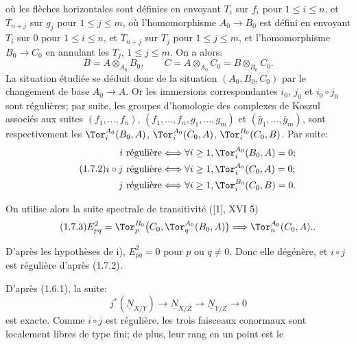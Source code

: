 
où les
flèches horizontales sont définies en envoyant $T_i$ sur $f_i$ pour $1\leq i\leq n$, et $T_{n+j}$ sur $g_j$ pour $1\leq j\leq m$, où l'homomorphisme $A_0\longrightarrow B_0$ est défini en envoyant $T_i$ sur $0$ pour $1\leq i\leq n$, et $T_{n+j}$ sur $T_j$ pour $1\leq j\leq m$, et l'homomorphisme $B_0\longrightarrow C_0$ en annulant les $T_j$, $1\leq j\leq m$. On a alors:
\[
 B=A\otimes_{A_0}B_0,
 \qquad
 C=A\otimes_{A_0}C_0=B\otimes_{B_0}C_0.
\]
La situation étudiée se déduit donc de la situation $(A_0,B_0,C_0)$ par le changement de base $A_0\longrightarrow A$. Or les immersions correspondantes $i_0$, $j_0$ et $i_0\circ j_0$ sont régulières; par suite, les groupes d'homologie des complexes de Koszul associés aux suites $(f_1,\ldots,f_n)$, $(f_1,\ldots,f_n,g_1,\ldots,g_m)$ et $(\bar g_1,\ldots,\bar g_m)$, sont respectivement les $\Tor_i^{A_0}(B_0,A)$, $\Tor_i^{A_0}(C_0,A)$, $\Tor_i^{B_0}(C_0,B)$. Par suite:
\begin{equation}\tag{1.7.2}
\begin{aligned}
 i\ \text{régulière} &\Longleftrightarrow \forall i\geq1,
 \Tor_i^{A_0}(B_0,A)=0;\\
 i\circ j\ \text{régulière} &\Longleftrightarrow \forall i\geq1,
 \Tor_i^{A_0}(C_0,A)=0;\\
 j\ \text{régulière} &\Longleftrightarrow \forall i\geq1,
 \Tor_i^{B_0}(C_0,B)=0.
\end{aligned}
\end{equation}

On utilise alors la suite spectrale de transitivité ([1], XVI 5)
\begin{equation}\tag{1.7.3}
E^2_{pq}=\Tor_p^{B_0}\bigl(C_0,\Tor_q^{A_0}(B_0,A)\bigr)
\Longrightarrow \Tor_n^{A_0}(C_0,A)..
\end{equation}

D'après les hypothèses de i), $E^2_{pq}=0$ pour $p$ ou $q\ne0$. Donc elle dégénère, et $i\circ j$ est régulière d'après (1.7.2).

D'après (1.6.1), la suite:
\[
 j^*(\underline{N}_{X/Y})\longrightarrow \underline{N}_{X/Z}\longrightarrow \underline{N}_{Y/Z}\longrightarrow0
\]
est exacte. Comme $i\circ j$ est régulière, les trois faisceaux conormaux sont localement libres de type fini; de plus, leur rang en un point est le
